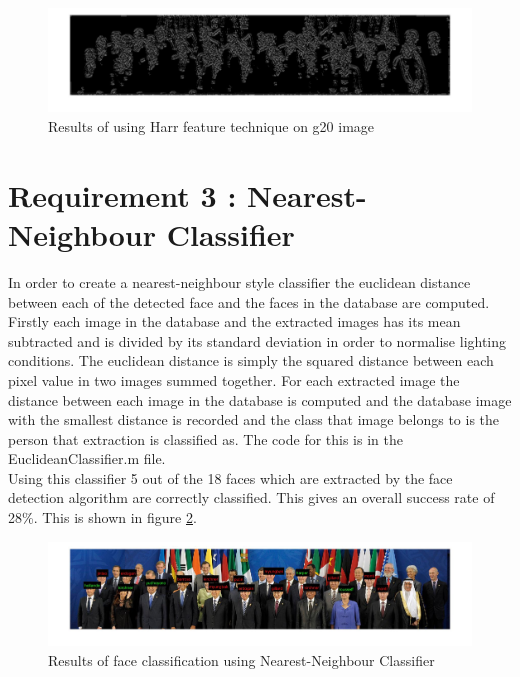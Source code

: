 \documentclass{article}
\begin{document}
\begin{figure}[H]
  \includegraphics[width=\linewidth]{harrfeat.jpg}
  \caption{Results of using Harr feature technique on g20 image}
  \label{fig:harrfeat}
\end{figure}

\section{Requirement 3 : Nearest-Neighbour Classifier}

In order to create a nearest-neighbour style classifier the euclidean distance
between each of the detected face and the faces in the database are computed.
Firstly each image in the database and the extracted images has its mean subtracted
and is divided by its standard deviation in order to normalise lighting conditions.
The euclidean distance is simply the squared distance between each pixel value
in two images summed together. For each extracted image the distance between each
image in the database is computed and the database image with the smallest distance
is recorded and the class that image belongs to is the person that extraction is
classified as. The code for this is in the EuclideanClassifier.m file.\\

Using this classifier 5 out of the 18 faces which are extracted by the face detection
algorithm are correctly classified. This gives an overall success rate of 28\%.
This is shown in figure \ref{fig:nnc}.

\begin{figure}[H]
  \includegraphics[width=\linewidth]{euclidean.jpg}
  \caption{Results of face classification using Nearest-Neighbour Classifier}
  \label{fig:nnc}
\end{figure}
\end{document}
